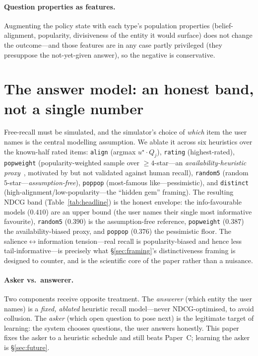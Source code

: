 \documentclass[11pt]{article}
\begin{document}
\paragraph{Question properties as features.} Augmenting the policy state with each type's population properties
(belief-alignment, popularity, divisiveness of the entity it would surface) does not change the outcome---and those
features are in any case partly privileged (they presuppose the not-yet-given answer), so the negative is conservative.

\section{The answer model: an honest band, not a single number}
\label{sec:answerer}
Free-recall must be simulated, and the simulator's choice of \emph{which} item the user names is the central modelling
assumption. We ablate it across six heuristics over the known-half rated items:
\texttt{align} (argmax $u^\star\!\cdot Q_j$), \texttt{rating} (highest-rated), \texttt{popweight} (popularity-weighted
sample over $\ge 4$-star---an \emph{availability-heuristic proxy}~\cite{tversky73}, motivated by but not validated against human recall),
\texttt{random5} (random $5$-star---\emph{assumption-free}), \texttt{poppop} (most-famous
like---pessimistic), and \texttt{distinct} (high-alignment/low-popularity---the ``hidden gem'' framing). The resulting
NDCG band (Table~\ref{tab:headline}) is the honest envelope: the info-favourable models ($0.410$) are an upper bound
(the user names their single most informative favourite), \texttt{random5} ($0.390$) is the assumption-free reference,
\texttt{popweight} ($0.387$) the availability-biased proxy, and \texttt{poppop} ($0.376$) the pessimistic floor. The salience$\leftrightarrow$information tension---real
recall is popularity-biased and hence less tail-informative---is precisely what \S\ref{sec:framing}'s distinctiveness
framing is designed to counter, and is the scientific core of the paper rather than a nuisance.

\paragraph{Asker vs.\ answerer.} Two components receive opposite treatment. The \emph{answerer} (which entity the user
names) is a \emph{fixed, ablated} heuristic recall model---never NDCG-optimised, to avoid collusion. The \emph{asker}
(which open question to pose next) is the legitimate target of learning: the system chooses questions, the user answers
honestly. This paper fixes the asker to a heuristic schedule and still beats Paper~C; learning the asker is
\S\ref{sec:future}.
\end{document}
